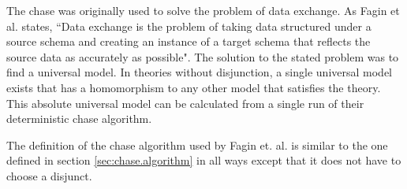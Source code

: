 		The chase was originally used to solve the problem of data exchange. As
		Fagin et al. states, ``Data exchange is the problem of taking data
		structured under a source schema and creating an instance of a target
		schema that reflects the source data as accurately as possible". The
		solution to the stated problem was to find a universal model. In theories
		without disjunction, a single universal model exists that has a
		homomorphism to any other model that satisfies the theory. This
		absolute universal model can be calculated from a single run of their
		deterministic chase algorithm.

		The definition of the chase algorithm used by Fagin et. al. is similar
		to the one defined in section \ref{sec:chase.algorithm} in all ways
		except that it does not have to choose a disjunct.
